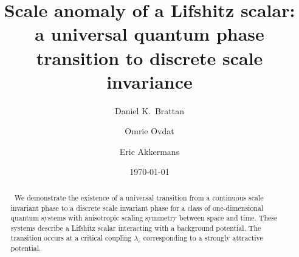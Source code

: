 \documentclass[aps,prl,reprint,preprintnumbers]{revtex4-1}
\begin{document}
\title{Scale anomaly of a Lifshitz scalar: a universal quantum phase transition to discrete scale invariance}

\date{\today}
\author{Daniel K.~Brattan}
\author{Omrie Ovdat}
\author{Eric Akkermans}

\begin{abstract}
{\ We demonstrate the existence of a universal transition from a continuous scale invariant phase to a discrete scale invariant phase for a class of one-dimensional quantum systems with anisotropic scaling symmetry between space and time. These systems describe a Lifshitz scalar interacting with a background potential. The transition occurs at a critical coupling $\lambda_{c}$ corresponding to a strongly attractive potential.}
\end{abstract}


\maketitle
\end{document}
